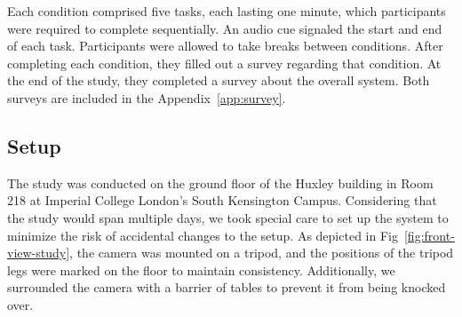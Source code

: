 Each condition comprised five tasks, each lasting one minute, which participants were required to complete sequentially. An audio cue signaled the start and end of each task. Participants were allowed to take breaks between conditions. After completing each condition, they filled out a survey regarding that condition. At the end of the study, they completed a survey about the overall system. Both surveys are included in the Appendix~\ref{app:survey}.
\subsection{Setup}

The study was conducted on the ground floor of the Huxley building in Room 218 at Imperial College London's South Kensington Campus. Considering that the study would span multiple days, we took special care to set up the system to minimize the risk of accidental changes to the setup. As depicted in Fig~\ref{fig:front-view-study}, the camera was mounted on a tripod, and the positions of the tripod legs were marked on the floor to maintain consistency. Additionally, we surrounded the camera with a barrier of tables to prevent it from being knocked over.

